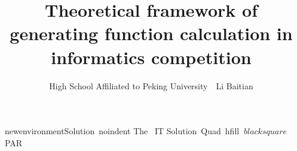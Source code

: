 \documentclass{noithesis}
\begin{document}

\theoremstyle{plain}
\newtheorem{theorem}{\hspace{2em} theorem}[section]
\newtheorem{lemma}{\hspace{2em} lemma}[section]

\theoremstyle{definition}
\newtheorem{definition}{\hspace{2em}Definition}[section]
\newtheorem{problem}{\hspace{2em}examples}

\ newenvironment{Solution}{{\ noindent The \ IT Solution\ Quad}}{\ hfill  $\ blacksquare $\ PAR}

\newif\ifcont

\title{Theoretical framework of generating function calculation in informatics competition}
\author{High School Affiliated to Peking University~~Li Baitian}

\maketitle


\end{document}
